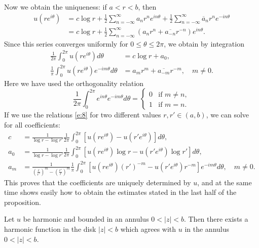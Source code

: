 \documentclass[a4paper,11pt]{article}
\begin{document}
Now we obtain the uniqueness: if $a < r < b$, then
$$
\begin{aligned}
  u(re^{i\theta}) 
  &= c\log r 
  + \frac{1}{2}\sum_{n=-\infty}^{\infty} a_n r^n e^{in\theta} 
  + \frac{1}{2}\sum_{n=-\infty}^{\infty} \overline{a}_n r^n e^{-in\theta} \\
  &= c\log r 
  + \frac{1}{2}\sum_{n=-\infty}^{\infty} (a_n r^n + \overline{a_{-n}}
  r^{-n}) e^{in\theta}.
\end{aligned}
$$
Since this series converges uniformly for $0 \le \theta \le 2\pi$, we
obtain by integration
\begin{equation}
  \label{e:8}
  \begin{aligned}
    \frac{1}{2\pi} \int_0^{2\pi} u(re^{i\theta}) d\theta
    &= c\log r + a_0,\\
    \frac{1}{\pi} \int_0^{2\pi} u(re^{i\theta}) e^{-im\theta} d\theta
    &= a_m r^m + \overline{a_{-m}} r^{-m},\quad m \ne 0.
  \end{aligned}
\end{equation}
Here we have used the orthogonality relation
$$
\frac{1}{2\pi} \int_0^{2\pi} e^{in\theta} e^{-im\theta} d \theta
=
\begin{cases}
  0 &\text{if } m \ne n,\\
  1 &\text{if } m = n.
\end{cases}
$$
If we use the relations \eqref{e:8} for two different values $r, r'
\in (a,b)$, we can solve for all coefficients:
$$
\begin{aligned}
  c &= \frac{1}{\log r - \log r'} \frac{1}{2\pi}
  \int_0^{2\pi} [u(re^{i\theta}) - u(r'e^{i\theta})] d\theta,\\
  a_0 &= \frac{1}{\log r - \log r'} \frac{1}{2\pi}
  \int_0^{2\pi} [u(re^{i\theta})\log r - u(r'e^{i\theta})
  \log r'] d\theta,\\
  a_m &= \frac{1}{(\frac{r}{r'})^m - (\frac{r'}{r})^m} \frac{1}{\pi}
  \int_0^{2\pi} [u(re^{i\theta})(r')^{-m} - u(r'e^{i\theta})
  r^{-m}] e^{-im\theta} d\theta,\quad m \ne 0.
\end{aligned}
$$
This proves that the coefficients are uniquely determined by $u$, and
at the same time shows easily how to obtain the estimates stated in
the last half of the proposition.

\begin{cor}
  Let $u$ be harmonic and bounded in an annulus $0 < |z| < b$.  Then
  there exists a harmonic function in the disk $|z| < b$ which agrees
  with $u$ in the annulus $0 < |z| < b$.
\end{cor}
\end{document}
